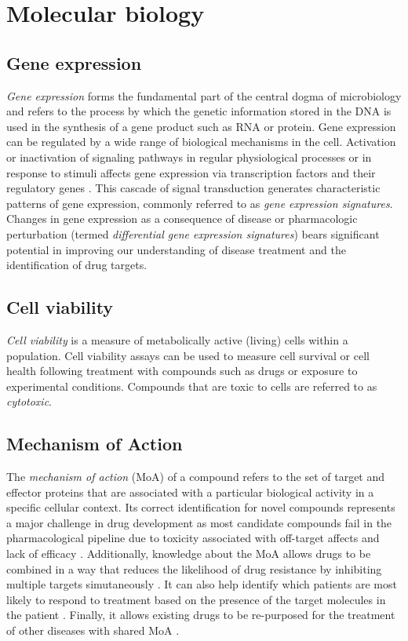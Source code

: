 \documentclass[bsc,frontabs,twoside,singlespacing,parskip,deptreport]{infthesis}     %
\let\Oldsection\section
\renewcommand{\section}{\FloatBarrier\Oldsection}
\let\Oldsubsection\subsection
\renewcommand{\subsection}{\FloatBarrier\Oldsubsection}
\begin{document}
\section{Molecular biology}
\subsection{Gene expression}
\textit{Gene expression} forms the fundamental part of the central dogma of microbiology \cite{crick_protein_1958} and refers to the process by which the genetic information stored in the DNA is used in the synthesis of a gene product such as RNA or protein. Gene expression can be regulated by a wide range of biological mechanisms in the cell. Activation or inactivation of signaling pathways in regular physiological processes or in response to stimuli affects gene expression via transcription factors and their regulatory genes \cite{itadani_can_2008}. This cascade of signal transduction generates characteristic patterns of gene expression, commonly referred to as \textit{gene expression signatures}.
Changes in gene expression as a consequence of disease or pharmacologic perturbation (termed \textit{differential gene expression signatures}) bears significant potential in improving our understanding of disease treatment and the identification of drug targets.
\subsection{Cell viability}
\textit{Cell viability} is a measure of metabolically active (living) cells within a population. Cell viability assays can be used to measure cell survival or cell health following treatment with compounds such as drugs or exposure to experimental conditions. Compounds that are toxic to cells are referred to as \textit{cytotoxic}.
\subsection{Mechanism of Action}
The \textit{mechanism of action} (MoA) of a compound refers to the set of target and effector proteins that are associated with a particular biological activity in a specific cellular context. Its correct identification for novel compounds represents a major challenge in drug development as most candidate compounds fail in the pharmacological pipeline due to toxicity associated with off-target affects and lack of efficacy \cite{wehling_assessing_2009}. Additionally, knowledge about the MoA allows drugs to be combined in a way that reduces the likelihood of drug resistance by inhibiting multiple targets simutaneously \cite{bozic_evolutionary_2013}. It can also help identify which patients are most likely to respond to treatment based on the presence of the target molecules in the patient \cite{noauthor_mechanism_2010}. Finally, it allows existing drugs to be re-purposed for the treatment of other diseases with shared MoA \cite{meninger_webcast_nodate}.
\end{document}
